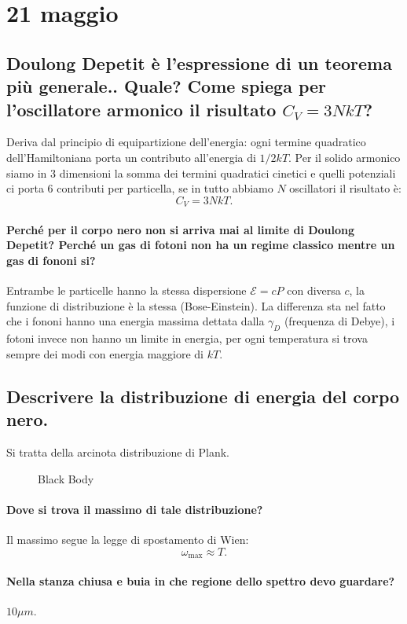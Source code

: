 \section{21 maggio}%
\label{sub:21 maggio}
\subsection{Doulong Depetit è l'espressione di un teorema più generale.. Quale? Come spiega per l'oscillatore armonico il risultato $C_V = 3NkT$?}%
Deriva dal principio di equipartizione dell'energia: ogni termine quadratico dell'Hamiltoniana porta un contributo all'energia di $1 /2 kT$. Per il solido armonico siamo in 3 dimensioni la somma dei termini quadratici cinetici e quelli potenziali ci porta 6 contributi per particella, se in tutto abbiamo $N$ oscillatori il risultato è:
\[
    C_V = 3NkT
.\] 
\paragraph{Perché per il corpo nero non si arriva mai al limite di Doulong Depetit? Perché un gas di fotoni non ha un regime classico mentre un gas di fononi si?}%
\label{par:Perchè per il corpo nero non si arriva mai al limite di Doulong Depetit?}
Entrambe le particelle hanno la stessa dispersione $\mathcal{E}  = c P$ con diversa $c$, la funzione di distribuzione è la stessa (Bose-Einstein). 
La differenza sta nel fatto che i fononi hanno una energia massima dettata dalla $\gamma_D$ (frequenza di Debye), i fotoni invece non hanno un limite in energia, per ogni temperatura si trova sempre dei modi con energia maggiore di $kT$.
\subsection{Descrivere la distribuzione di energia del corpo nero.}%
Si tratta della arcinota distribuzione di Plank.
\begin{figure}[ht]
    \centering
    \caption{Black Body}
    \label{fig:black-body}
\end{figure}
\paragraph{Dove si trova il massimo di tale distribuzione?}%
Il massimo segue la legge di spostamento di Wien:
\[
    \omega_\text{max} \approx  T
.\] 
\paragraph{Nella stanza chiusa e buia in che regione dello spettro devo guardare?}%
\label{par:Nella stanza chiusa e buia in che regione dello spettro devo guardare?}
 $10 \mu m$.

